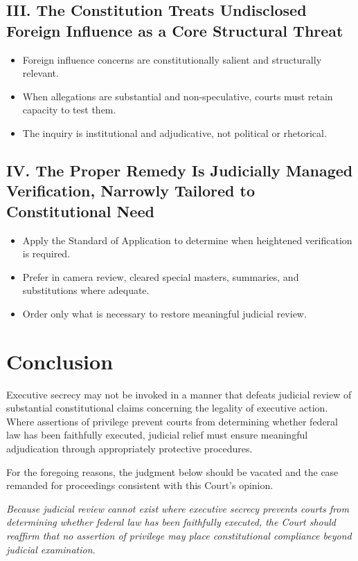 \documentclass[12pt]{article}
\begin{document}
\subsection*{III. The Constitution Treats Undisclosed Foreign Influence as a Core Structural Threat}
\begin{itemize}[leftmargin=*, itemsep=0.3em]
  \item Foreign influence concerns are constitutionally salient and structurally relevant.
  \item When allegations are substantial and non-speculative, courts must retain capacity to test them.
  \item The inquiry is institutional and adjudicative, not political or rhetorical.
\end{itemize}

\subsection*{IV. The Proper Remedy Is Judicially Managed Verification, Narrowly Tailored to Constitutional Need}
\begin{itemize}[leftmargin=*, itemsep=0.3em]
  \item Apply the Standard of Application to determine when heightened verification is required.
  \item Prefer in camera review, cleared special masters, summaries, and substitutions where adequate.
  \item Order only what is necessary to restore meaningful judicial review.
\end{itemize}

\section*{Conclusion}

Executive secrecy may not be invoked in a manner that defeats judicial review of substantial constitutional claims concerning the legality of executive action.
Where assertions of privilege prevent courts from determining whether federal law has been faithfully executed, judicial relief must ensure meaningful adjudication through appropriately protective procedures.

For the foregoing reasons, the judgment below should be vacated and the case remanded for proceedings consistent with this Court’s opinion.

\medskip

\emph{Because judicial review cannot exist where executive secrecy prevents courts from determining whether federal law has been faithfully executed, the Court should reaffirm that no assertion of privilege may place constitutional compliance beyond judicial examination.}
\end{document}
